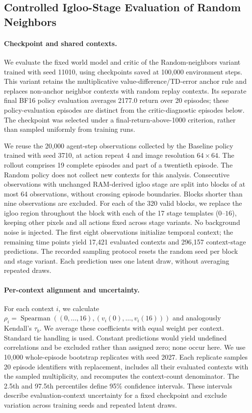 \subsection{Controlled Igloo-Stage Evaluation of Random Neighbors}
\label{app:random11010_alignment}
\paragraph{Checkpoint and shared contexts.}
We evaluate the fixed world model and critic of the Random-neighbors variant trained with seed 11010, using checkpoints saved at 100,000 environment steps. This variant retains the multiplicative value-difference/TD-error anchor rule and replaces non-anchor neighbor contexts with random replay contexts. Its separate final BF16 policy evaluation averages 2177.0 return over 20 episodes; these policy-evaluation episodes are distinct from the critic-diagnostic episodes below. The checkpoint was selected under a final-return-above-1000 criterion, rather than sampled uniformly from training runs.

We reuse the 20,000 agent-step observations collected by the Baseline policy trained with seed 3710, at action repeat 4 and image resolution $64\times64$. The rollout comprises 19 complete episodes and part of a twentieth episode. The Random policy does not collect new contexts for this analysis. Consecutive observations with unchanged RAM-derived igloo stage are split into blocks of at most 64 observations, without crossing episode boundaries. Blocks shorter than nine observations are excluded. For each of the 320 valid blocks, we replace the igloo region throughout the block with each of the 17 stage templates ($0$--$16$), keeping other pixels and all actions fixed across stage variants. No background noise is injected. The first eight observations initialize temporal context; the remaining time points yield 17,421 evaluated contexts and 296,157 context-stage predictions. The recorded sampling protocol resets the random seed per block and stage variant. Each prediction uses one latent draw, without averaging repeated draws.

\paragraph{Per-context alignment and uncertainty.}
For each context $i$, we calculate $\rho_i=\operatorname{Spearman}((0,\ldots,16),(v_i(0),\ldots,v_i(16)))$ and analogously Kendall's $\tau_b$. We average these coefficients with equal weight per context. Standard tie handling is used. Constant predictions would yield undefined correlations and be excluded rather than assigned zero; none occur here. We use 10,000 whole-episode bootstrap replicates with seed 2027. Each replicate samples 20 episode identifiers with replacement, includes all their evaluated contexts with the sampled multiplicity, and recomputes the context-count denominator. The 2.5th and 97.5th percentiles define 95\% confidence intervals. These intervals describe evaluation-context uncertainty for a fixed checkpoint and exclude variation across training seeds and repeated latent draws.

